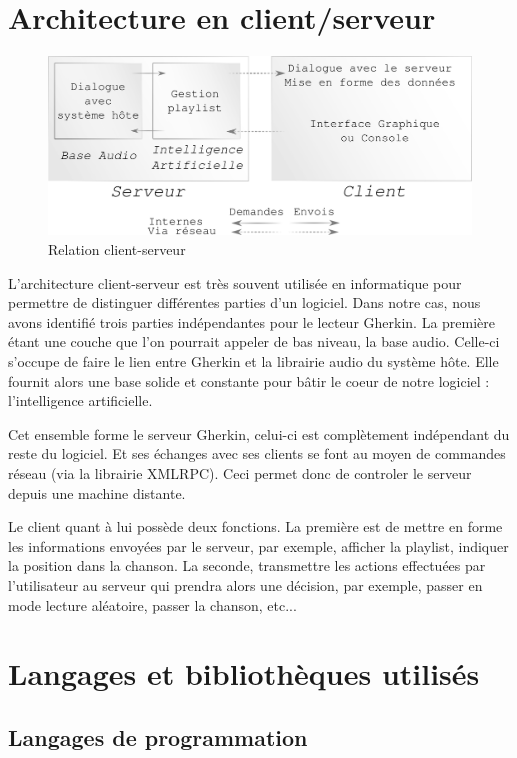 \documentclass{report}
\begin{document}
\chapter{Architecture en client/serveur}

\begin{figure}[ht]
\centering
\includegraphics[scale=.8]{clientServeur.png}
\caption{Relation client-serveur}
\end{figure}

L'architecture client-serveur est très souvent utilisée en informatique pour permettre de distinguer différentes parties d'un logiciel. Dans notre cas, nous avons identifié trois parties indépendantes pour le lecteur Gherkin. La première étant une couche que l'on pourrait appeler de bas niveau, la base audio. Celle-ci s'occupe de faire le lien entre Gherkin et la librairie audio du système hôte. Elle fournit alors une base solide et constante pour bâtir le coeur de notre logiciel : l'intelligence artificielle.

Cet ensemble forme le serveur Gherkin, celui-ci est complètement indépendant du reste du logiciel. Et ses échanges avec ses clients se font au moyen de commandes réseau (via la librairie XMLRPC). Ceci permet donc de controler le serveur depuis une machine distante.

Le client quant à lui possède deux fonctions. La première est de mettre en forme les informations envoyées par le serveur, par exemple, afficher la playlist, indiquer la position dans la chanson. La seconde, transmettre les actions effectuées par l'utilisateur au serveur qui prendra alors une décision, par exemple, passer en mode lecture aléatoire, passer la chanson, etc...

\chapter{Langages et bibliothèques utilisés}

\section{Langages de programmation}
\end{document}
